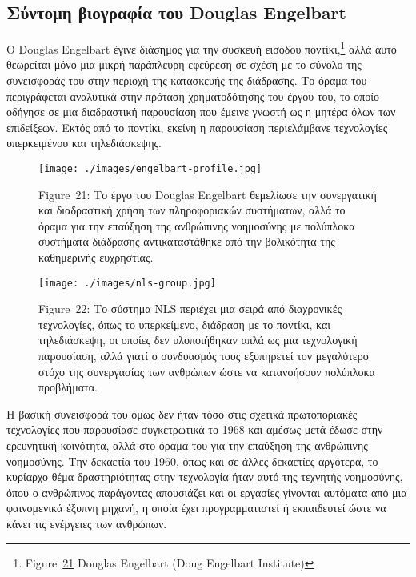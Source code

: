 \documentclass[
]{article}
\begin{document}
\hypertarget{ux3c3ux3cdux3bdux3c4ux3bfux3bcux3b7-ux3b2ux3b9ux3bfux3b3ux3c1ux3b1ux3c6ux3afux3b1-ux3c4ux3bfux3c5-douglas-engelbart}{%
\subsection{Σύντομη βιογραφία του Douglas
Engelbart}\label{ux3c3ux3cdux3bdux3c4ux3bfux3bcux3b7-ux3b2ux3b9ux3bfux3b3ux3c1ux3b1ux3c6ux3afux3b1-ux3c4ux3bfux3c5-douglas-engelbart}}

O Douglas Engelbart έγινε διάσημος για την συσκευή εισόδου
ποντίκι,\footnote{Figure~\protect\hyperlink{fig:engelbart-profile}{21}
  Douglas Engelbart (Doug Engelbart Institute)} αλλά αυτό θεωρείται μόνο
μια μικρή παράπλευρη εφεύρεση σε σχέση με το σύνολο της συνεισφοράς του
στην περιοχή της κατασκευής της διάδρασης. Το όραμα του περιγράφεται
αναλυτικά στην πρόταση χρηματοδότησης του έργου του, το οποίο οδήγησε σε
μια διαδραστική παρουσίαση που έμεινε γνωστή ως η μητέρα όλων των
επιδείξεων. Εκτός από το ποντίκι, εκείνη η παρουσίαση περιελάμβανε
τεχνολογίες υπερκειμένου και τηλεδιάσκεψης.

\leavevmode{}%
\begin{figure}
\hypertarget{fig:engelbart-profile}{%
\centering
\texttt{[image: ./images/engelbart-profile.jpg]}
\caption{Figure~21: Το έργο του Douglas Engelbart θεμελίωσε την
συνεργατική και διαδραστική χρήση των πληροφοριακών συστήματων, αλλά το
όραμα για την επαύξηση της ανθρώπινης νοημοσύνης με πολύπλοκα συστήματα
διάδρασης αντικαταστάθηκε από την βολικότητα της καθημερινής
ευχρηστίας.}\label{fig:engelbart-profile}
}
\end{figure}

\leavevmode{}%
\begin{figure}
\hypertarget{fig:nls-group}{%
\centering
\texttt{[image: ./images/nls-group.jpg]}
\caption{Figure~22: Το σύστημα NLS περιέχει μια σειρά από διαχρονικές
τεχνολογίες, όπως το υπερκείμενο, διάδραση με το ποντίκι, και
τηλεδιάσκεψη, οι οποίες δεν υλοποιήθηκαν απλά ως μια τεχνολογική
παρουσίαση, αλλά γιατί ο συνδυασμός τους εξυπηρετεί τον μεγαλύτερο στόχο
της συνεργασίας των ανθρώπων ώστε να κατανοήσουν πολύπλοκα
προβλήματα.}\label{fig:nls-group}
}
\end{figure}

Η βασική συνεισφορά του όμως δεν ήταν τόσο στις σχετικά πρωτοποριακές
τεχνολογίες που παρουσίασε συγκετρωτικά το 1968 και αμέσως μετά έδωσε
στην ερευνητική κοινότητα, αλλά στο όραμα του για την επαύξηση της
ανθρώπινης νοημοσύνης. Την δεκαετία του 1960, όπως και σε άλλες
δεκαετίες αργότερα, το κυρίαρχο θέμα δραστηριότητας στην τεχνολογία ήταν
αυτό της τεχνητής νοημοσύνης, όπου ο ανθρώπινος παράγοντας απουσιάζει
και οι εργασίες γίνονται αυτόματα από μια φαινομενικά έξυπνη μηχανή, η
οποία έχει προγραμματιστεί ή εκπαιδευτεί ώστε να κάνει τις ενέργειες των
ανθρώπων.
\end{document}

